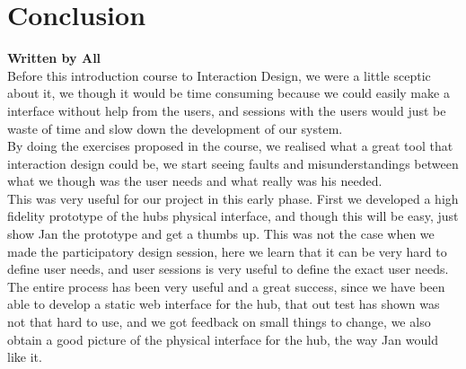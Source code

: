 \chapter{Conclusion}
\textbf{Written by All}\\
Before this introduction course to Interaction Design, we were a little sceptic about it, we though it would be time consuming because we could easily make a interface without help from the users, and sessions with the users would just be waste of time and slow down the development of our system.\\
By doing the exercises proposed in the course, we realised what a great tool that interaction design could be, we start seeing faults and misunderstandings between what we though was the user needs and what really was his needed.\\
This was very useful for our project in this early phase. First we developed a high fidelity prototype of the hubs physical interface, and though this will be easy, just show Jan the prototype and get a thumbs up. This was not the case when we made the participatory design session, here we learn that it can be very hard to define user needs, and user sessions is very useful to define the exact user needs.\\

The entire process has been very useful and a great success, since we have been able to develop a static web interface for the hub, that out test has shown was not that hard to use, and we got feedback on small things to change, we also obtain a good picture of the physical interface for the hub, the way Jan would like it.





